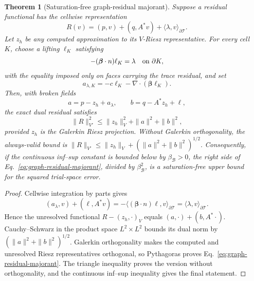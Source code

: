 \documentclass[11pt]{article}
\newtheorem{theorem}{Theorem}[section]
\numberwithin{algorithm}{section}
\theoremstyle{definition}\newtheorem{definition}[theorem]{Definition}
\theoremstyle{remark}\newtheorem{remark}[theorem]{Remark}
\begin{document}
\begin{theorem}[Saturation-free graph-residual majorant]
\label{thm:graph-residual-majorant}
Suppose a residual functional has the cellwise representation
\[
 R(v)=(p,v)+(q,A^*v)+\langle\lambda,v\rangle_{\partial\mathcal T}.
\]
Let $z_h$ be any computed approximation to its $V$-Riesz representative.
For every cell $K$, choose a lifting $\ell_K$ satisfying
\[
 -(\boldsymbol\beta\cdot n)\ell_K=\lambda
 \quad\hbox{on }\partial K,
\]
with the equality imposed only on faces carrying the trace residual, and set
\[
 a_{\lambda,K}=-c\ell_K-\nabla\cdot(\boldsymbol\beta\ell_K).
\]
Then, with broken fields
\[
 a=p-z_h+a_\lambda,
 \qquad b=q-A^*z_h+\ell,
\]
the exact dual residual satisfies
\begin{equation}
 \|R\|_{V'}^2
 \leq \|z_h\|_V^2+\|a\|^2+\|b\|^2,
 \label{eq:graph-residual-majorant}
\end{equation}
provided $z_h$ is the Galerkin Riesz projection.  Without Galerkin
orthogonality, the always-valid bound is
$\|R\|_{V'}\leq\|z_h\|_V+(\|a\|^2+\|b\|^2)^{1/2}$.
Consequently, if the continuous inf--sup constant is bounded below by
$\beta_{\mathcal B}>0$, the right side of
Eq.~\eqref{eq:graph-residual-majorant}, divided by
$\beta_{\mathcal B}^2$, is a saturation-free upper bound for the squared
trial-space error.
\end{theorem}

\begin{proof}
Cellwise integration by parts gives
\[
 (a_\lambda,v)+(\ell,A^*v)
 =-\langle(\boldsymbol\beta\cdot n)\ell,v\rangle_{\partial\mathcal T}
 =\langle\lambda,v\rangle_{\partial\mathcal T}.
\]
Hence the unresolved functional $R-(z_h,\cdot)_V$ equals
$(a,\cdot)+(b,A^*\cdot)$.  Cauchy--Schwarz in the product space
$L^2\times L^2$ bounds its dual norm by
$(\|a\|^2+\|b\|^2)^{1/2}$.  Galerkin orthogonality makes the computed and
unresolved Riesz representatives orthogonal, so Pythagoras proves
Eq.~\eqref{eq:graph-residual-majorant}.  The triangle inequality proves the
version without orthogonality, and the continuous inf--sup inequality gives
the final statement.
\end{proof}
\end{document}
